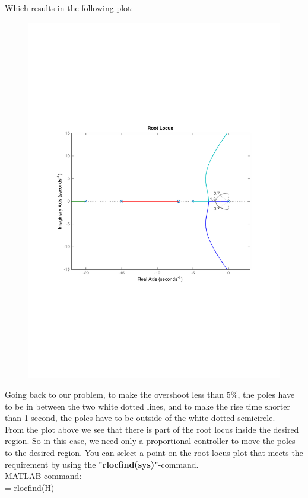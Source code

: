 \begin{frame}
	\begin{exampleblock}{}
		Which results in the following plot:
		\vspace{-0.5em}
		\begin{figure}
			\centering
			\includegraphics[width=0.7\linewidth]{matlab_ex2}
		\end{figure}
	\end{exampleblock}
\end{frame}

\begin{frame}
	\begin{exampleblock}{}
		Going back to our problem, to make the overshoot less than $5\%$, the poles have to be in between the two white dotted lines, and to make the rise time shorter than 1 second, the poles have to be outside of the white dotted semicircle.\\
		\vspace{1em}
		From the plot above we see that there is part of the root locus inside the desired region. So in this case, we need only a proportional controller to move the poles to the desired region. You can select a point on the root locus plot that meets the requirement by using the \textbf{"rlocfind(sys)"}-command.\\
		\vspace{1em}
		MATLAB command:\\
		[k,poles] = rlocfind(H)
	\end{exampleblock}
\end{frame}

